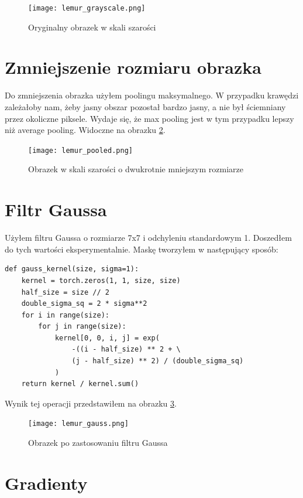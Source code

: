 \documentclass[a4paper]{article}
\begin{document}
\begin{figure}[H]
    \centering
    \texttt{[image: lemur\_grayscale.png]}
    \caption{Oryginalny obrazek w skali szarości}
    \label{fig:lemur_grayscale}
\end{figure}

\section{Zmniejszenie rozmiaru obrazka}

Do zmniejszenia obrazka użyłem poolingu maksymalnego. W przypadku krawędzi
zależałoby nam, żeby  jasny obszar pozostał bardzo jasny, a nie był ściemniany
przez okoliczne piksele. Wydaje się, że max pooling jest w tym przypadku
lepszy niż average pooling. Widoczne na obrazku \ref{fig:lemur_grayscale_small}.

\begin{figure}[H]
    \centering
    \texttt{[image: lemur\_pooled.png]}
    \caption{Obrazek w skali szarości o dwukrotnie mniejszym rozmiarze}
    \label{fig:lemur_grayscale_small}
\end{figure}

\section{Filtr Gaussa}

Użyłem filtru Gaussa o rozmiarze 7x7 i odchyleniu standardowym 1.
Doszedłem do tych wartości eksperymentalnie.
Maskę tworzyłem w następujący sposób:

\begin{lstlisting}
def gauss_kernel(size, sigma=1):
    kernel = torch.zeros(1, 1, size, size)
    half_size = size // 2
    double_sigma_sq = 2 * sigma**2
    for i in range(size):
        for j in range(size):
            kernel[0, 0, i, j] = exp(
                -((i - half_size) ** 2 + \
                (j - half_size) ** 2) / (double_sigma_sq)
            )
    return kernel / kernel.sum()
\end{lstlisting}

Wynik tej operacji przedstawiłem na obrazku \ref{fig:lemur_gauss}.

\begin{figure}[H]
    \centering
    \texttt{[image: lemur\_gauss.png]}
    \caption{Obrazek po zastosowaniu filtru Gaussa}
    \label{fig:lemur_gauss}
\end{figure}

\section{Gradienty}
\end{document}
